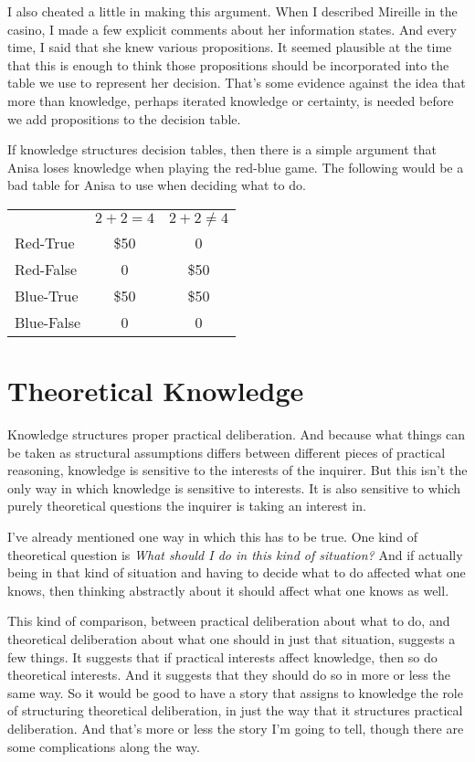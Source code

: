 \documentclass[11pt,]{book}
\def\toprule{}
\def\bottomrule{}
\begin{document}
I also cheated a little in making this argument. When I described Mireille in the casino, I made a few explicit comments about her information states. And every time, I said that she knew various propositions. It seemed plausible at the time that this is enough to think those propositions should be incorporated into the table we use to represent her decision. That's some evidence against the idea that more than knowledge, perhaps iterated knowledge or certainty, is needed before we add propositions to the decision table.

If knowledge structures decision tables, then there is a simple argument that Anisa loses knowledge when playing the red-blue game. The following would be a bad table for Anisa to use when deciding what to do.

\begin{longtable}[]{@{}lcc@{}}
\toprule
\endhead
& \(2+2=4\) & \(2+2 \neq 4\)\tabularnewline
Red-True & \$50 & 0\tabularnewline
Red-False & 0 & \$50\tabularnewline
Blue-True & \$50 & \$50\tabularnewline
Blue-False & 0 & 0\tabularnewline
\bottomrule
\end{longtable}

\hypertarget{theoreticalknowledge}{%
\section{Theoretical Knowledge}\label{theoreticalknowledge}}

Knowledge structures proper practical deliberation. And because what things can be taken as structural assumptions differs between different pieces of practical reasoning, knowledge is sensitive to the interests of the inquirer. But this isn't the only way in which knowledge is sensitive to interests. It is also sensitive to which purely theoretical questions the inquirer is taking an interest in.

I've already mentioned one way in which this has to be true. One kind of theoretical question is \emph{What should I do in this kind of situation?} And if actually being in that kind of situation and having to decide what to do affected what one knows, then thinking abstractly about it should affect what one knows as well.

This kind of comparison, between practical deliberation about what to do, and theoretical deliberation about what one should in just that situation, suggests a few things. It suggests that if practical interests affect knowledge, then so do theoretical interests. And it suggests that they should do so in more or less the same way. So it would be good to have a story that assigns to knowledge the role of structuring theoretical deliberation, in just the way that it structures practical deliberation. And that's more or less the story I'm going to tell, though there are some complications along the way.
\end{document}
